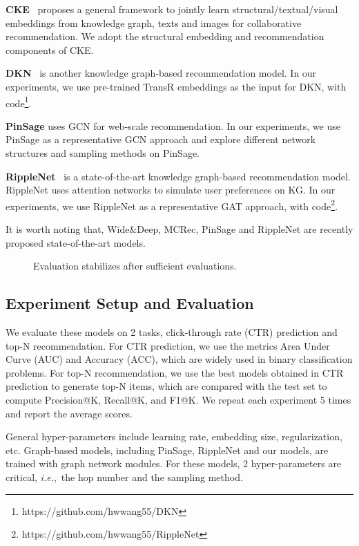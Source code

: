 \documentclass[sigconf]{acmart}
\newcommand{\ie}{\emph{i.e.},~}
\begin{document}
\textbf{CKE}~\cite{zhang2016collaborative} proposes a general framework to jointly learn structural/textual/visual embeddings from knowledge graph, texts and images for collaborative recommendation. We adopt the structural embedding and recommendation components of CKE.

\textbf{DKN}~\cite{wang2018dkn} is another knowledge graph-based recommendation model. In our experiments, we use pre-trained TransR embeddings as the input for DKN, with code\footnote{https://github.com/hwwang55/DKN}.

\textbf{PinSage} \cite{ying2018graph} uses GCN for web-scale recommendation. 
In our experiments, we use PinSage as a representative GCN approach and explore different network structures and sampling methods on PinSage.

\textbf{RippleNet}~\cite{wang2018ripplenet} is a state-of-the-art knowledge graph-based recommendation model. RippleNet uses attention networks to simulate user preferences on KG. In our experiments, we use RippleNet as a representative  GAT approach, with code\footnote{https://github.com/hwwang55/RippleNet}.

It is worth noting that, Wide\&Deep, MCRec, PinSage and RippleNet are recently proposed state-of-the-art models.

\begin{figure}
    \caption{Evaluation stabilizes after sufficient evaluations.} \label{fig:n_eval}
\end{figure}

\subsection{Experiment Setup and Evaluation}

We evaluate these models on 2 tasks, click-through rate (CTR) prediction and top-N recommendation.
For CTR prediction, we use the metrics Area Under Curve (AUC) and Accuracy (ACC), which are widely used in binary classification problems.
For top-N recommendation, we use the best models obtained in CTR prediction to generate top-N items, which are compared with the test set to compute Precision@K, Recall@K, and F1@K.
We repeat each experiment 5 times and report the average scores.

General hyper-parameters include learning rate, embedding size, regularization, etc.
Graph-based models, including PinSage, RippleNet and our models, are trained with graph network modules.
For these models, 2 hyper-parameters are critical, \ie the hop number and the sampling method.
\end{document}
